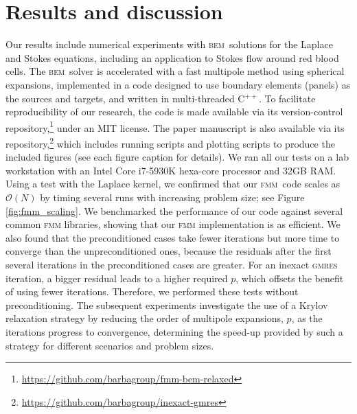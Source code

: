 \documentclass[final,3p,times]{elsarticle}
\newcommand{\bem}{\textsc{bem}\xspace}
\newcommand{\fmm}{\textsc{fmm}\xspace}
\newcommand{\cpp}{C$^{++}$}
\renewcommand{\O}[1]{\mathcal{O}(#1)}
\newcommand{\gmres}{\textsc{gmres}\xspace}
\begin{document}
\section{Results and discussion}
Our results include numerical experiments with \bem\ solutions for the Laplace and Stokes equations, including an application to Stokes flow around red blood cells. The \bem\ solver is accelerated with a fast multipole method using spherical expansions, implemented in a code designed to use boundary elements (panels) as the sources and targets, and written in multi-threaded \cpp. To facilitate reproducibility of our research, the code is made available via its version-control repository,\footnote{\href{https://github.com/barbagroup/fmm-bem-relaxed}{https://github.com/barbagroup/fmm-bem-relaxed}} under an MIT license. The paper manuscript is also available via its repository,\footnote{\href{https://github.com/barbagroup/inexact-gmres}{https://github.com/barbagroup/inexact-gmres}} which includes running scripts and plotting scripts to produce the included figures (see each figure caption for details).
We ran all our tests on a lab workstation with an Intel Core i7-5930K hexa-core processor and 32GB RAM. Using a test with the Laplace kernel, we confirmed that our \fmm\ code scales as $\O{N}$ by timing several runs with increasing problem size; see Figure \ref{fig:fmm_scaling}. We benchmarked the performance of our code against several common \fmm libraries, showing that our \fmm implementation is as efficient. We also found that the preconditioned cases take fewer iterations but more time to converge than the unpreconditioned ones, because the residuals after the first several iterations in the preconditioned cases are greater. For an inexact {\gmres} iteration, a bigger residual leads to a higher required $p$, which offsets the benefit of using fewer iterations. Therefore, we performed these tests without preconditioning.
The subsequent experiments investigate the use of a Krylov relaxation strategy by reducing the order of multipole expansions, $p$, as the iterations progress to convergence, determining the speed-up provided by such a strategy for different scenarios and problem sizes.
\end{document}
